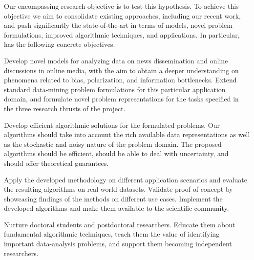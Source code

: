 \documentclass[a4paper,11pt]{article}
\begin{document}
\medskip
Our encompassing research objective is to test this hypothesis.
To achieve this objective we aim to consolidate existing approaches, 
including our recent work, 
and push significantly the state-of-the-art 
in terms of models, novel problem formulations, 
improved algorithmic techniques, and applications.
In particular, {\acronym} has the following concrete objectives. 
%
\begin{description}
\setlength{\itemsep}{-1pt}
\item[{Models:}]
Develop novel models for analyzing data on news dissemination and online discussions in online media, 
with the aim to obtain a deeper understanding on phenomena related to bias, polarization, and 
information bottlenecks.
Extend standard data-mining problem formulations for this particular application domain, 
and formulate novel problem representations for the tasks specified in the three research thrusts of the project.

\item[{Algorithms:}]
Develop efficient algorithmic solutions for the formulated problems.
Our algorithms should take into account the rich available data representations
as well as the stochastic and noisy nature of the problem domain.
The proposed algorithms should be efficient, 
should be able to deal with uncertainty, and should offer theoretical guarantees.


\item[{Applications:}]
Apply the developed methodology on different application scenarios 
and evaluate the resulting algorithms on real-world datasets.
Validate proof-of-concept by showcasing findings of the methods on different use cases. 
Implement the developed algorithms and make them available to the scientific community.

\item[{Education:}]
Nurture doctoral students and postdoctoral researchers.
Educate them about fundamental algorithmic techniques,
teach them the value of identifying important data-analysis problems, 
and support them becoming independent researchers.
\end{description}

\end{document}
